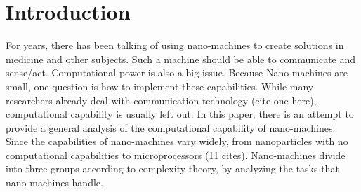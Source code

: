 \documentclass[10pt,sigconf]{acmart}
\begin{document}
\section{Introduction}
For years, there has been talking of using nano-machines to create solutions in medicine and other subjects. Such a machine should be able to communicate and sense/act. Computational power is also a big issue.
Because Nano-machines are small, one question is how to implement these capabilities. 
While many researchers already deal with communication technology (cite one here), computational capability is usually left out.
In this paper, there is an attempt to provide a general analysis of the computational capability of nano-machines.
Since the capabilities of nano-machines vary widely, from nanoparticles with no computational capabilities to microprocessors (11 cites). Nano-machines divide into three groups according to complexity theory,
by analyzing the tasks that nano-machines handle.
\end{document}
